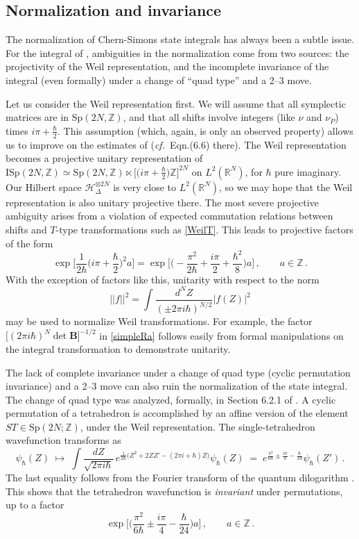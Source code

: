 \documentclass[12pt]{amsart}
\renewcommand{\eta}{\nu}
\theoremstyle{definition}
\def\BR{\mathbb R}
\def\be{  \begin{equation} }
\def\ee{  \end{equation} }
\def\Sp{\mathrm{Sp}}
\def\ISp{\mathrm{ISp}}
\newcommand{\CH}{\mathcal{H}}
\newcommand{\Z}{\mathbb{Z}}
\newcommand{\cf}{\emph{cf.}}
\newcommand{\mb}{\mathbf}
\numberwithin{equation}{section}
\begin{document}
\subsection{Normalization and invariance}
\label{app.norm}

The normalization of Chern-Simons state integrals has always been a subtle issue. For the integral of \cite{D1}, ambiguities in the normalization come from two sources: the projectivity of the Weil representation, and the incomplete invariance of the integral (even formally) under a change of ``quad type'' and a 2--3 move.

Let us consider the Weil representation first. We will assume that all symplectic matrices are in $\Sp(2N,\Z)$, and that all shifts involve integers (like $\eta$ and $\eta_P$) times $i\pi+\tfrac\hbar 2$. This assumption (which, again, is only an observed property) allows us to improve on the estimates of \cite{D1} (\cf\ Eqn.(6.6) there).  The Weil representation becomes a projective unitary representation of $\ISp(2N,\Z)\simeq \Sp(2N,\Z)\ltimes \big[\big(i\pi+\tfrac\hbar2\big)\Z\big]^{2N}$ on $L^2(\BR^N)$, for $\hbar$ pure imaginary. Our Hilbert space $\CH_\Delta^{\otimes 2N}$ is very close to $L^2(\BR^N)$, so we may hope that the Weil representation is also unitary projective there. The most severe projective ambiguity arises from a violation of expected commutation relations between shifts and $T$-type transformations such as \eqref{WeilT}. This leads to projective factors of the form
%
\be \label{Weilproj} \exp\Big[\frac{1}{2\hbar}\Big(i\pi+\frac\hbar 2\Big)^2a\Big]=\exp\Big[\Big(-\frac{\pi^2}{2\hbar}+\frac{i\pi}{2}+\frac{\hbar^2}{8}\Big)a\Big]\,,\qquad a\in \Z\,.
\ee
%
With the exception of factors like this, unitarity with respect to the norm 
$$
|\!|f|\!|^2=\int \frac{d^N\!Z}{(\pm2\pi i\hbar)^{N/2}}|f(Z)|^2
$$ 
may be used to normalize Weil transformations. For example, the factor $\big[(2\pi i\hbar)^N\det \mb B\big]^{-1/2}$ in \eqref{simpleRa} follows easily from formal manipulations on the integral transformation to demonstrate unitarity.


The lack of complete invariance under a change of quad type (cyclic permutation invariance) and a 2--3 move can also ruin the normalization of the state integral. The change of quad type was analyzed, formally, in Section 6.2.1 of \cite{D1}. A cyclic permutation of a tetrahedron is accomplished by an affine version of the element $ST\in \Sp(2N;\Z)$, under the Weil representation. The single-tetrahedron wavefunction transforms 
as
%
\be 
\psi_\hbar(Z) \;\mapsto\; \int \frac{dZ}{\sqrt{2\pi i\hbar}}\,e^{\tfrac1{2\hbar}\big(Z^2+2ZZ'-(2\pi i+\hbar)Z\big)}\psi_\hbar(Z) \;=\; e^{\tfrac{\pi^2}{6\hbar}\pm\tfrac{i\pi}{4}-\tfrac\hbar{24}}\psi_\hbar(Z')\,.
\ee
%
The last equality follows from the Fourier transform of the quantum dilogarithm \cite{FKVolkov,PT}. This shows that the tetrahedron wavefunction is \emph{invariant} under permutations, up to a factor
%
\be \label{quadproj}
\exp\Big[\Big(\frac{\pi^2}{6\hbar}\pm\frac{i\pi}{4}-\frac\hbar{24}\Big)a\Big]\,,\qquad a\in \Z\,.\ee
\end{document}
